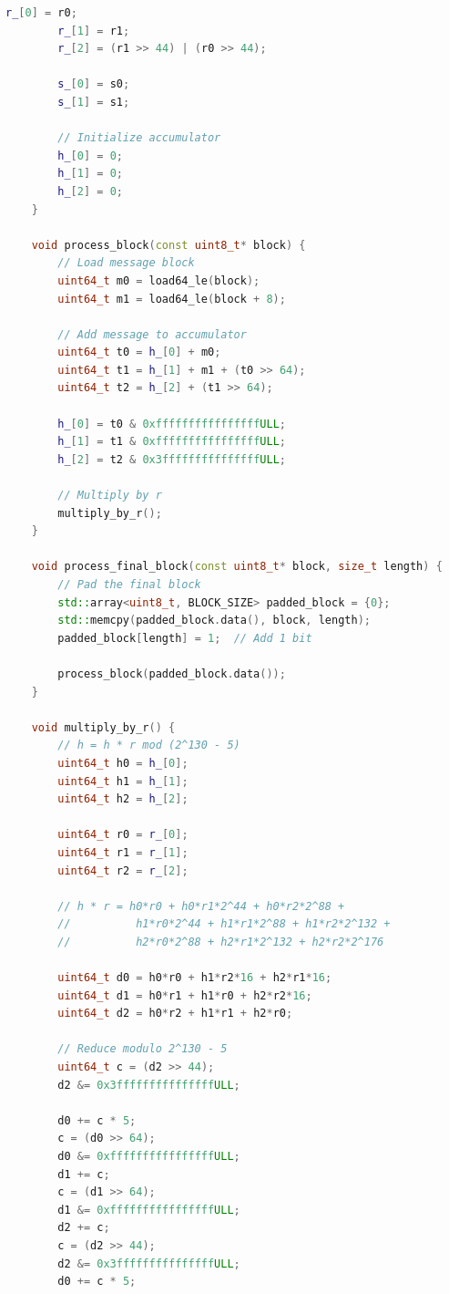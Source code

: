 \documentclass[11pt,a4paper]{article}
\begin{document}
\begin{lstlisting}[language=C++, caption=Poly1305 Implementation]
        r_[0] = r0;
        r_[1] = r1;
        r_[2] = (r1 >> 44) | (r0 >> 44);
        
        s_[0] = s0;
        s_[1] = s1;
        
        // Initialize accumulator
        h_[0] = 0;
        h_[1] = 0;
        h_[2] = 0;
    }
    
    void process_block(const uint8_t* block) {
        // Load message block
        uint64_t m0 = load64_le(block);
        uint64_t m1 = load64_le(block + 8);
        
        // Add message to accumulator
        uint64_t t0 = h_[0] + m0;
        uint64_t t1 = h_[1] + m1 + (t0 >> 64);
        uint64_t t2 = h_[2] + (t1 >> 64);
        
        h_[0] = t0 & 0xffffffffffffffffULL;
        h_[1] = t1 & 0xffffffffffffffffULL;
        h_[2] = t2 & 0x3fffffffffffffffULL;
        
        // Multiply by r
        multiply_by_r();
    }
    
    void process_final_block(const uint8_t* block, size_t length) {
        // Pad the final block
        std::array<uint8_t, BLOCK_SIZE> padded_block = {0};
        std::memcpy(padded_block.data(), block, length);
        padded_block[length] = 1;  // Add 1 bit
        
        process_block(padded_block.data());
    }
    
    void multiply_by_r() {
        // h = h * r mod (2^130 - 5)
        uint64_t h0 = h_[0];
        uint64_t h1 = h_[1];
        uint64_t h2 = h_[2];
        
        uint64_t r0 = r_[0];
        uint64_t r1 = r_[1];
        uint64_t r2 = r_[2];
        
        // h * r = h0*r0 + h0*r1*2^44 + h0*r2*2^88 +
        //          h1*r0*2^44 + h1*r1*2^88 + h1*r2*2^132 +
        //          h2*r0*2^88 + h2*r1*2^132 + h2*r2*2^176
        
        uint64_t d0 = h0*r0 + h1*r2*16 + h2*r1*16;
        uint64_t d1 = h0*r1 + h1*r0 + h2*r2*16;
        uint64_t d2 = h0*r2 + h1*r1 + h2*r0;
        
        // Reduce modulo 2^130 - 5
        uint64_t c = (d2 >> 44);
        d2 &= 0x3fffffffffffffffULL;
        
        d0 += c * 5;
        c = (d0 >> 64);
        d0 &= 0xffffffffffffffffULL;
        d1 += c;
        c = (d1 >> 64);
        d1 &= 0xffffffffffffffffULL;
        d2 += c;
        c = (d2 >> 44);
        d2 &= 0x3fffffffffffffffULL;
        d0 += c * 5;
        

\end{lstlisting}
\end{document}

